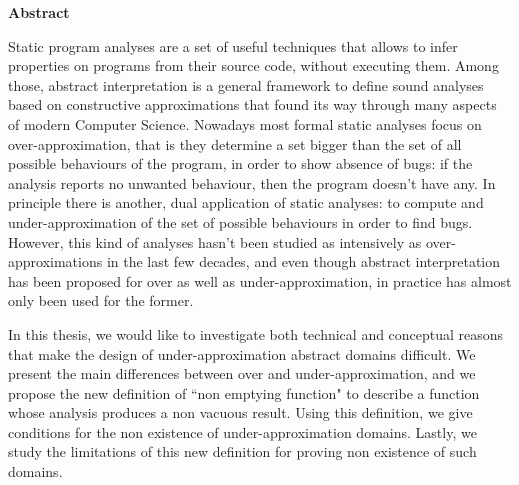 \thispagestyle{plain}
\begin{center}
	\Large
	\textbf{\thesistitle}


	\vspace{1.2cm}
	\large
	\peopleheader
	\textbf{\authornamefl} \hfill \textbf{\supervisors}

	\vspace{2.0cm}
	\textbf{Abstract}
\end{center}
Static program analyses are a set of useful techniques that allows to infer properties on programs from their source code, without executing them. Among those, abstract interpretation is a general framework to define sound analyses based on constructive approximations that found its way through many aspects of modern Computer Science.
Nowadays most formal static analyses focus on over-approximation, that is they determine a set bigger than the set of all possible behaviours of the program, in order to show absence of bugs: if the analysis reports no unwanted behaviour, then the program doesn't have any.
In principle there is another, dual application of static analyses: to compute and under-approximation of the set of possible behaviours in order to find bugs. However, this kind of analyses hasn't been studied as intensively as over-approximations in the last few decades, and even though abstract interpretation has been proposed for over as well as under-approximation, in practice has almost only been used for the former.

In this thesis, we would like to investigate both technical and conceptual reasons that make the design of under-approximation abstract domains difficult. We present the main differences between over and under-approximation, and we propose the new definition of ``non emptying function" to describe a function whose analysis produces a non vacuous result. Using this definition, we give conditions for the non existence of under-approximation domains. Lastly, we study the limitations of this new definition for proving non existence of such domains.
